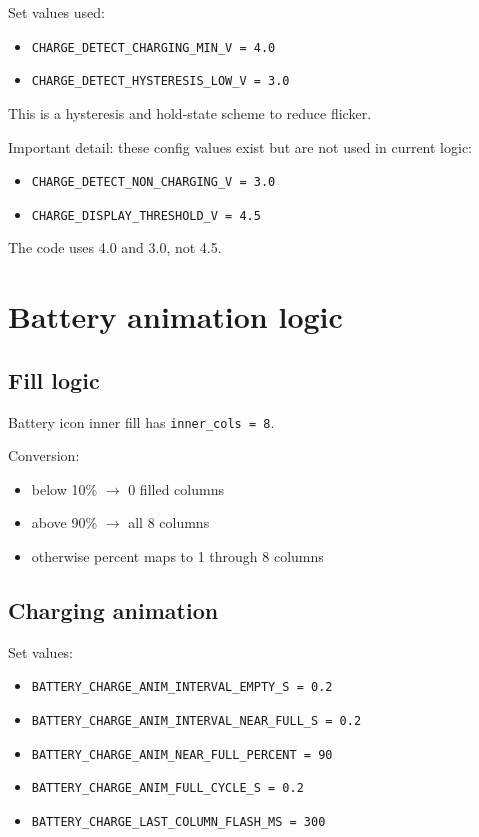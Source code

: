 \documentclass[11pt]{article}
\begin{document}
Set values used:
\begin{itemize}
  \item \texttt{CHARGE\_DETECT\_CHARGING\_MIN\_V = 4.0}
  \item \texttt{CHARGE\_DETECT\_HYSTERESIS\_LOW\_V = 3.0}
\end{itemize}

This is a hysteresis and hold-state scheme to reduce flicker.

Important detail: these config values exist but are not used in current logic:
\begin{itemize}
  \item \texttt{CHARGE\_DETECT\_NON\_CHARGING\_V = 3.0}
  \item \texttt{CHARGE\_DISPLAY\_THRESHOLD\_V = 4.5}
\end{itemize}

The code uses 4.0 and 3.0, not 4.5.

\section{Battery animation logic}
\subsection{Fill logic}
Battery icon inner fill has \texttt{inner\_cols = 8}.

Conversion:
\begin{itemize}
  \item below 10\% $\rightarrow$ 0 filled columns
  \item above 90\% $\rightarrow$ all 8 columns
  \item otherwise percent maps to 1 through 8 columns
\end{itemize}

\subsection{Charging animation}
Set values:
\begin{itemize}
  \item \texttt{BATTERY\_CHARGE\_ANIM\_INTERVAL\_EMPTY\_S = 0.2}
  \item \texttt{BATTERY\_CHARGE\_ANIM\_INTERVAL\_NEAR\_FULL\_S = 0.2}
  \item \texttt{BATTERY\_CHARGE\_ANIM\_NEAR\_FULL\_PERCENT = 90}
  \item \texttt{BATTERY\_CHARGE\_ANIM\_FULL\_CYCLE\_S = 0.2}
  \item \texttt{BATTERY\_CHARGE\_LAST\_COLUMN\_FLASH\_MS = 300}
\end{itemize}
\end{document}
